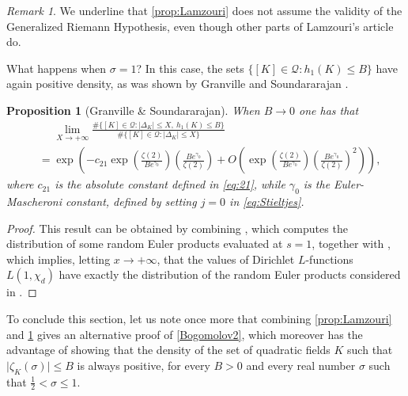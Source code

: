 \documentclass[10pt,a4paper]{amsart}
\theoremstyle{plain}
\newtheorem{proposition}[theorem]{Proposition}
\theoremstyle{definition}
\theoremstyle{remark}
\newtheorem{remark}[theorem]{Remark}
\begin{document}
    \begin{remark}
        We underline that \cref{prop:Lamzouri} does not assume the validity of the Generalized Riemann Hypothesis, even though other parts of Lamzouri's article \cite{Lamzouri_2011} do. 
    \end{remark}

    What happens when $\sigma = 1$? In this case, the sets $\{[K] \in \mathcal{Q} \colon h_1(K) \leq B\}$ have again positive density, as was shown by Granville and Soundararajan \cite{Granville_Soundararajan_2003}.

    \begin{proposition}[Granville \& Soundararajan] \label{prop:Granville_Soundararajan}
        When $B \to 0$ one has that
        \[
            \begin{aligned}
                &\phantom{=} \lim_{X \to +\infty} \frac{\# \{ [K] \in \mathcal{Q} \colon \lvert \Delta_K \rvert \leq X, \ h_1(K) \leq B \}}{\# \{ [K] \in \mathcal{Q} \colon \lvert \Delta_K \rvert \leq X\}} \\ &= \exp\left( - c_{21} \exp\left( \frac{\zeta(2)}{B e^{\gamma_0}} \right) \left( \frac{B e^{\gamma_0}}{\zeta(2)} \right) + O\left( \exp\left( \frac{\zeta(2)}{B e^{\gamma_0}} \right) \left( \frac{B e^{\gamma_0}}{\zeta(2)} \right)^2 \right) \right),
            \end{aligned}
        \]
        where $c_{21}$ is the absolute constant defined in \eqref{eq:21}, while $\gamma_0$ is the Euler-Mascheroni constant, defined by setting $j=0$ in \eqref{eq:Stieltjes}.
    \end{proposition}
\begin{proof}
    This result can be obtained by combining \cite[Proposition~1]{Granville_Soundararajan_2003}, which computes the distribution of some random Euler products evaluated at $s = 1$, together with \cite[Theorem~2]{Granville_Soundararajan_2003}, which implies, letting $x \to +\infty$, that the values of Dirichlet $L$-functions $L(1,\chi_d)$ have exactly the distribution of the random Euler products considered in \cite[Proposition~1]{Granville_Soundararajan_2003}.
\end{proof}

To conclude this section, let us note once more that combining \cref{prop:Lamzouri} and \cref{prop:Granville_Soundararajan} gives an alternative proof of \cref{Bogomolov2}, which moreover has the advantage of showing that the density of the set of quadratic fields $K$ such that $\lvert \zeta_K(\sigma) \rvert \leq B$ is always positive, for every $B > 0$ and every real number $\sigma$ such that $\frac{1}{2} < \sigma \leq 1$. 
\end{document}
